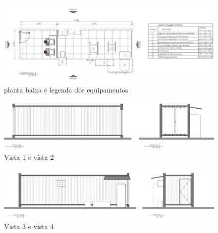 \begin{anexosenv}
\begin{figure}[h!]
	\centering
	\includegraphics[keepaspectratio=true,scale= 0.6]{figuras/plantaBaixa1.PNG}
	\caption{planta baixa e legenda dos equipamentos}
	\label{plantabaixa-e-legenda}
\end{figure}

\begin{figure}[h!]
	\centering
	\includegraphics[keepaspectratio=true,scale= 0.6]{figuras/plantaBaixa2.PNG}
	\caption{Vista 1 e vista 2}
	\label{vista1-e-vista2}
\end{figure}

\begin{figure}[h!]
	\centering
	\includegraphics[keepaspectratio=true,scale= 0.6]{figuras/plantaBaixa3.PNG}
	\caption{Vista 3 e vista 4}
	\label{vista1-e-vista2}
\end{figure}

\end{anexosenv}




